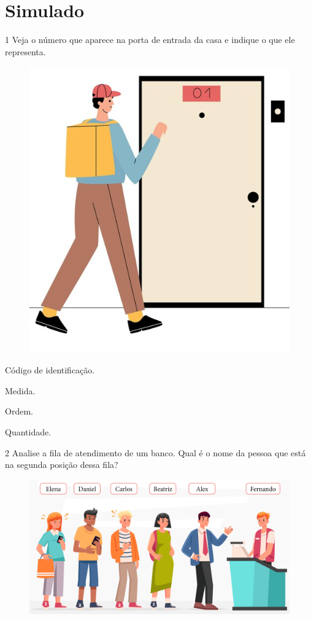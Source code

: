 \setcounter{chapter}{0}
\chapter[Simulado 1]{Simulado}

\num{1} Veja o número que aparece na porta de entrada da casa e indique o que
ele representa.

\begin{figure}[H]
\centering
\includegraphics[width=.6\textwidth]{./media/image105old.png}
\end{figure}


\begin{escolha}[itemsep=-5pt]
\item Código de identificação.

\item Medida.

\item Ordem.

\item Quantidade.
\end{escolha}

\num{2} Analise a fila de atendimento de um banco. Qual é o nome da pessoa que
está na segunda posição dessa fila?

\begin{figure}[H]
\centering
\includegraphics[width=.8\textwidth]{./media/image113.png}
\end{figure}

